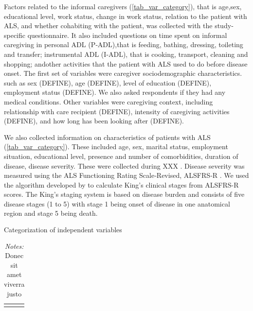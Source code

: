 \documentclass[12pt]{article}
\begin{document}
Factors related to the informal caregivers (\autoref{tab_var_category}), that is age,sex, educational level, work status, change in work status, relation to the patient with ALS, and whether cohabiting with the patient, was collected with the study‐specific questionnaire. It also included questions on time spent on informal caregiving in personal ADL (P‐ADL),that is feeding, bathing, dressing, toileting and transfer; instrumental ADL (I‐ADL), that is cooking, transport, cleaning and shopping; andother activities that the patient with ALS used to do before disease onset. The first set of variables were caregiver sociodemographic characteristics.  such as sex (DEFINE), age (DEFINE), level of education (DEFINE), employment status (DEFINE). We also asked respondents if they had any medical conditions. Other variables were caregiving context, including relationship with care recipient (DEFINE), intensity of caregiving activities (DEFINE), and how long has been looking after (DEFINE).

We also collected information on characteristics of patients with ALS (\autoref{tab_var_category}). These included age, sex, marital status, employment situation, educational level, presence and number of comorbidities, duration of disease, disease severity. These were collected during XXX \parencite{gould_acceptance_2024}. Disease severity was measured using the ALS Functioning Rating Scale‐Revised, ALSFRS‐R \parencite{cedarbaum_alsfrs-r_1999}. We used the algorithm developed by \textcite{balendra_estimating_2014} to calculate King's clinical stages from ALSFRS-R scores. The King's staging system is based on disease burden and consists of five disease stages (1 to 5) with stage 1 being onset of disease in one anatomical region and stage 5 being death.

\hspace{1em}
\begin{table}[H]
    \centering \singlespacing \small
    \caption{Categorization of independent variables}
    \begin{tabular}{|L{6cm}|L{9cm}|}
        \hline
    \end{tabular}
    \label{tab_var_category}
    \caption*{\footnotesize \textit{Notes:} Donec sit amet viverra justo}
\end{table}
\end{document}
